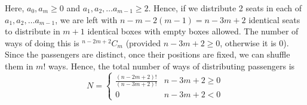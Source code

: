 \documentclass[12pt,answers]{exam}
\begin{document}
\begin{questions}
\begin{solution}
Here, $a_0, a_m \ge 0$ and $a_1, a_2, \ldots a_{m-1} \ge 2$. Hence, if we distribute 2 seats in each of $a_1, a_2, \ldots a_{m-1}$, we are left with $n-m-2(m-1) = n-3m+2$ identical seats to distribute in $m+1$ identical boxes with empty boxes allowed. The number of ways of doing this is $^{n-2m+2}C_m$ (provided $n-3m+2 \ge 0$, otherwise it is $0$). Since the passengers are distinct, once their positions are fixed, we can shuffle them in $m!$ ways. Hence, the total number of ways of distributing passengers is 
$$N = \begin{cases}
\frac{(n-2m+2)!}{(n-3m+2)!} & n-3m+2 \ge 0 \\
0 & n-3m+2 < 0
\end{cases}$$
\end{solution}

\end{questions}
\end{document}
